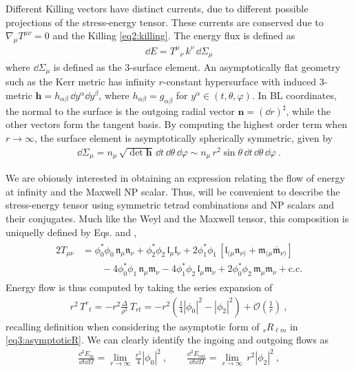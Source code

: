 Different Killing vectors have distinct currents, due to different possible projections of the stress-energy tensor.
These currents are conserved due to $\nabla_\mu T^{\mu\nu}=0$ and the Killing \eqref{eq2:killing}.
The energy flux is defined as
\begin{align}
    \label{eq3:fluxE}
    \dd E = T^{\mu}{}_\nu \, k^\nu \,\dd\Sigma_\mu
\end{align}
where $\dd \Sigma_\mu$ is defined as the 3-surface element.
An asymptotically flat geometry such as the Kerr metric has infinity $r$-constant hypersurface with induced 3-metric $\bm{h} = h_{\alpha\beta} \,\dd y^\alpha \dd y^\beta$, where $h_{\alpha\beta} = g_{\alpha\beta}$ for $y^\alpha \in (t, \theta, \varphi)$.
In BL coordinates, the normal to the surface is the outgoing radial vector $\bm{n}=(\dd r)^\sharp$, while the other vectors form the tangent basis.
By computing the highest order term when $r\to\infty$, the surface element is asymptotically spherically symmetric, given by
\begin{align}
    \label{eq3:radial3SurfaceElement}
    \dd\Sigma_\mu = n_\mu \,\sqrt{\det{\bm{h}}} \,\dd t \,\dd \theta \,\dd \varphi \sim n_\mu \,r^2 \sin\theta \,\dd t \,\dd \theta \,\dd \varphi ~.
\end{align}

We are obiously interested in obtaining an expression relating the flow of energy at infinity and the Maxwell NP scalar. Thus, will be convenient to describe the stress-energy tensor using symmetric tetrad combinations and NP scalars and their conjugates. Much like the Weyl and the Maxwell tensor, this composition is uniquelly defined by Eqs.  and ,
\begin{align}
    \begin{split}
    2 T_{\mu\nu} &= \phi_0^* \phi_0 \, \mathfrak{n}_\mu \mathfrak{n}_\nu + \phi_2^* \phi_2 \, \mathfrak{l}_\mu \mathfrak{l}_\nu + 2 \phi_1^* \phi_1 \, [ \mathfrak{l}_{(\mu} \mathfrak{n}_{\nu)} + \mathfrak{m}_{(\mu} \bar{\mathfrak{m}}_{\nu)} ] \\
    &\qquad - 4 \phi_0^* \phi_1 \, \mathfrak{n}_\mu \mathfrak{m}_\nu - 4 \phi_1^* \phi_2 \, \mathfrak{l}_\mu \mathfrak{m}_\nu + 2 \phi_0^* \phi_2 \, \mathfrak{m}_\mu \mathfrak{m}_\nu + \text{c.c.}
    \end{split}
    \label{eq3:stressEnergyPhi}
\end{align}
Energy flow is thus computed by taking the series expansion of
\begin{align}
    r^2 \,T^{r}{}_t = - r^2 \frac{\Delta}{\rho^2} \,T_{rt} = - r^2 \left(\frac{1}{4} |\phi_0|^2 - |\phi_2|^2\right) + \mathscr{O}\left(\frac{1}{r}\right) ~,
\end{align}
recalling definition  when considering the asymptotic form of ${}_{s}R_{\ell m}$ in \eqref{eq3:asymptoticR}.
We can clearly identify the ingoing and outgoing flows as
\begin{align}
    \frac{\dd^2 E_\mathrm{in}}{\dd t \dd\Omega} = \lim_{r\to\infty} \,\frac{r^2}{4} |\phi_0|^2 ~,\qquad \frac{\dd^2 E_\mathrm{out}}{\dd t \dd\Omega} = \lim_{r\to\infty} \, r^2 |\phi_2|^2 ~,
\end{align}

